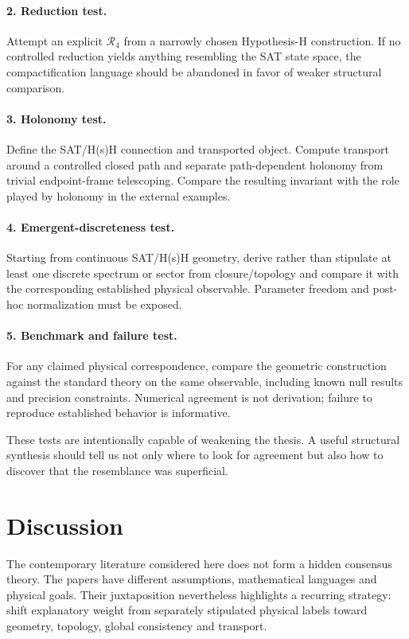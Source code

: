 \documentclass[11pt]{article}
\begin{document}
\paragraph{2. Reduction test.} Attempt an explicit $\mathcal R_4$ from a narrowly chosen Hypothesis-H construction. If no controlled reduction yields anything resembling the SAT state space, the compactification language should be abandoned in favor of weaker structural comparison.

\paragraph{3. Holonomy test.} Define the SAT/H(s)H connection and transported object. Compute transport around a controlled closed path and separate path-dependent holonomy from trivial endpoint-frame telescoping. Compare the resulting invariant with the role played by holonomy in the external examples.

\paragraph{4. Emergent-discreteness test.} Starting from continuous SAT/H(s)H geometry, derive rather than stipulate at least one discrete spectrum or sector from closure/topology and compare it with the corresponding established physical observable. Parameter freedom and post-hoc normalization must be exposed.

\paragraph{5. Benchmark and failure test.} For any claimed physical correspondence, compare the geometric construction against the standard theory on the same observable, including known null results and precision constraints. Numerical agreement is not derivation; failure to reproduce established behavior is informative.

These tests are intentionally capable of weakening the thesis. A useful structural synthesis should tell us not only where to look for agreement but also how to discover that the resemblance was superficial.

\section{Discussion}
The contemporary literature considered here does not form a hidden consensus theory. The papers have different assumptions, mathematical languages and physical goals. Their juxtaposition nevertheless highlights a recurring strategy: shift explanatory weight from separately stipulated physical labels toward geometry, topology, global consistency and transport.
\end{document}
